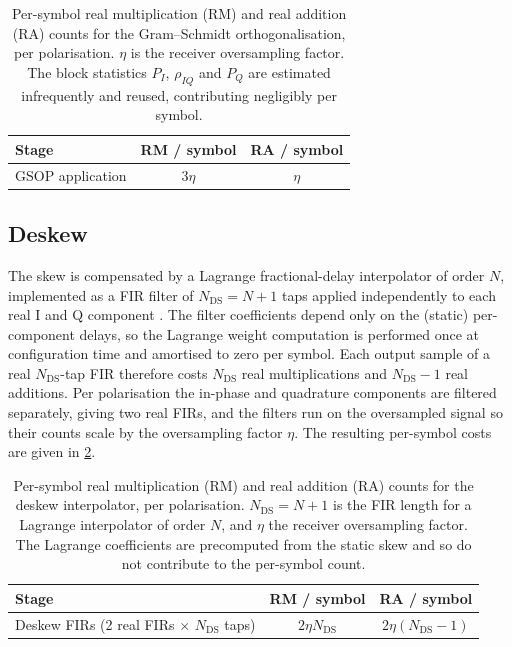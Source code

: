 \documentclass[12pt,a4paper]{report}
\begin{document}
\begin{table}[H]
    \centering
    \begin{tabular}{lcc}
        \toprule
        Stage & RM / symbol & RA / symbol \\
        \midrule
        GSOP application & $3\eta$ & $\eta$ \\
        \bottomrule
    \end{tabular}
    \caption{Per-symbol real multiplication (RM) and real addition (RA) counts for the Gram--Schmidt orthogonalisation, per polarisation. $\eta$ is the receiver oversampling factor. The block statistics $P_I$, $\rho_{IQ}$ and $P_Q$ are estimated infrequently and reused, contributing negligibly per symbol.}
    \label{tab:gsop_cost}
\end{table}

\subsection{Deskew}
The skew is compensated by a Lagrange fractional-delay interpolator of order $N$, implemented as a FIR filter of $N_\mathrm{DS} = N+1$ taps applied independently to each real I and Q component \cite{Mello;21}. The filter coefficients depend only on the (static) per-component delays, so the Lagrange weight computation is performed once at configuration time and amortised to zero per symbol. Each output sample of a real $N_\mathrm{DS}$-tap FIR therefore costs $N_\mathrm{DS}$ real multiplications and $N_\mathrm{DS}-1$ real additions. Per polarisation the in-phase and quadrature components are filtered separately, giving two real FIRs, and the filters run on the oversampled signal so their counts scale by the oversampling factor $\eta$. The resulting per-symbol costs are given in \cref{tab:deskew_cost}.

\begin{table}[H]
    \centering
    \begin{tabular}{lcc}
        \toprule
        Stage & RM / symbol & RA / symbol \\
        \midrule
        Deskew FIRs (2 real FIRs $\times$ $N_\mathrm{DS}$ taps) & $2\eta N_\mathrm{DS}$ & $2\eta(N_\mathrm{DS}-1)$ \\
        \bottomrule
    \end{tabular}
    \caption{Per-symbol real multiplication (RM) and real addition (RA) counts for the deskew interpolator, per polarisation. $N_\mathrm{DS} = N+1$ is the FIR length for a Lagrange interpolator of order $N$, and $\eta$ the receiver oversampling factor. The Lagrange coefficients are precomputed from the static skew and so do not contribute to the per-symbol count.}
    \label{tab:deskew_cost}
\end{table}
\end{document}
